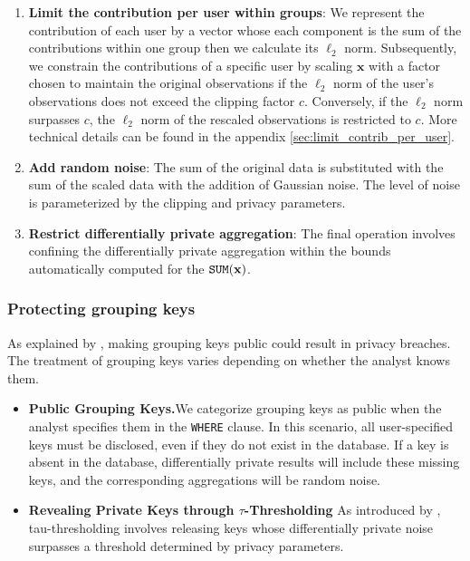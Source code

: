 \documentclass[letterpaper]{article} %
\begin{document}
\begin{enumerate}
	\item \textbf{Limit the contribution per user within groups}:
	We represent the contribution of each user by a vector whose each component is the sum of the contributions within one group
    then we calculate its $\ell_2$ norm.
    Subsequently, we constrain the contributions of a specific user by scaling $\textbf{x}$ with a factor chosen to maintain the original observations if the $\ell_2$ norm of the user's observations does not exceed the clipping factor $c$.
    Conversely, if the $\ell_2$ norm surpasses $c$, the $\ell_2$  norm of the rescaled observations is restricted to $c$.
    More technical details can be found in the appendix \ref{sec:limit_contrib_per_user}.

	\item \textbf{Add random noise}:
	The sum of the original data is substituted with the sum of the scaled data with the addition of Gaussian noise. The level of noise is parameterized by the clipping and privacy parameters.

	\item \textbf{Restrict differentially private aggregation}:
	The final operation involves confining the differentially private aggregation within the bounds automatically computed for the $\text{\texttt{SUM}}(\textbf{x})$.
\end{enumerate}

\subsubsection{Protecting grouping keys}
As explained by \citeauthor{wilson2019differentially}, making grouping keys public could result in privacy breaches.
The treatment of grouping keys varies depending on whether the analyst knows them.

\begin{itemize}
	\item \textbf{Public Grouping Keys.}We categorize grouping keys as public when the analyst specifies them in the \texttt{WHERE} clause.
	In this scenario, all user-specified keys must be disclosed, even if they do not exist in the database.
	If a key is absent in the database, differentially private results will include these missing keys, and the corresponding aggregations will be random noise.
	\item \textbf{Revealing Private Keys through $\tau$-Thresholding}
	As introduced by \citeauthor{wilson2019differentially}, tau-thresholding involves releasing keys whose differentially private noise surpasses a threshold determined by privacy parameters.
\end{itemize}
\end{document}
